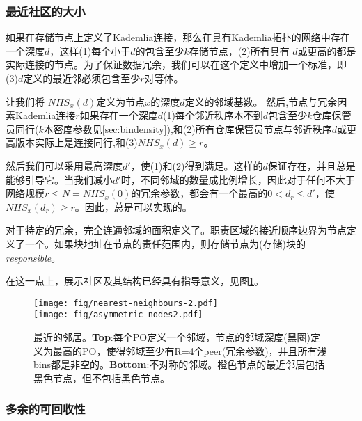 \subsubsection{最近社区的大小}

如果在存储节点上定义了Kademlia连接，那么在具有Kademlia拓扑的网络中存在一个深度$d$，这样(1)每个小于$d$的包含至少$k$存储节点，(2)所有具有 $d$或更高的都是实际连接的节点。为了保证数据冗余，我们可以在这个定义中增加一个标准，即(3)$d$定义的最近邻必须包含至少$r$对等体。

让我们将 $\mathit{NHS}_x(d)$定义为节点$x$的深度$d$定义的邻域基数。
然后,节点与冗余因素Kademlia连接$r$如果存在一个深度$d$(1)每个邻近秩序本不到$d$包含至少$k$仓库保管员同行($k$本密度参数见\ref{sec:bindensity}),和(2)所有仓库保管员节点与邻近秩序$d$或更高版本实际上是连接同行,和(3)$\mathit{NHS}_x(d)\geq r$。

然后我们可以采用最高深度$d'$，使(1)和(2)得到满足。这样的$d$保证存在，并且总是能够引导它。当我们减小$d'$时，不同邻域的数量成比例增长，因此对于任何不大于网络规模$r\leq N=\mathit{NHS}_x(0)$的冗余参数，都会有一个最高的$0<d_r\leq d'$，使$\mathit{NHS}_x(d_r)\geq r$。因此，总是可以实现的。



对于特定的冗余，完全连通邻域的面积定义了。职责区域的接近顺序边界为节点定义了一个。如果块地址在节点的责任范围内，则存储节点为(存储)块的\emph{responsible}。

在这一点上，展示社区及其结构已经具有指导意义，见图\ref{fig:nearest-neighbours}。 

\begin{figure}[htbp]
   \centering
   \texttt{[image: fig/nearest-neighbours-2.pdf]} \\\texttt{[image: fig/asymmetric-nodes2.pdf]}
   \caption[最近的邻居\statusgreen]{最近的邻居。\textbf{Top}:每个PO定义一个邻域，节点的邻域深度(黑圈)定义为最高的PO，使得邻域至少有R=4个peer(冗余参数)，并且所有浅bins都是非空的。\textbf{Bottom}:不对称的邻域。橙色节点的最近邻居包括黑色节点，但不包括黑色节点。}
   \label{fig:nearest-neighbours}
\end{figure}


\subsubsection{多余的可回收性}

